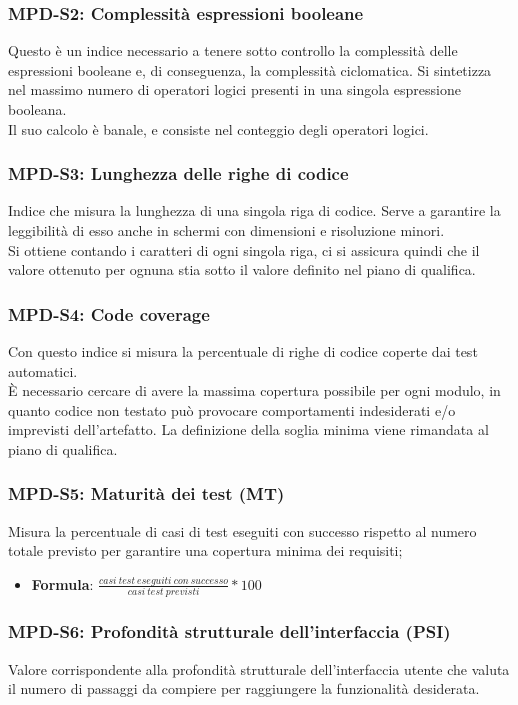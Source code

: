 \subsubsection{MPD-S2: Complessità espressioni booleane}
Questo è un indice necessario a tenere sotto controllo la complessità delle espressioni booleane e, di conseguenza, la complessità ciclomatica.
Si sintetizza nel massimo numero di operatori logici presenti in una singola espressione booleana.\\
Il suo calcolo è banale, e consiste nel conteggio degli operatori logici.

\subsubsection{MPD-S3: Lunghezza delle righe di codice}
Indice che misura la lunghezza di una singola riga di codice. Serve a garantire la leggibilità di esso anche in schermi
con dimensioni e risoluzione minori.\\
Si ottiene contando i caratteri di ogni singola riga, ci si assicura quindi che il valore ottenuto per ognuna stia sotto il valore
definito nel piano di qualifica.

\subsubsection{MPD-S4: Code coverage}
Con questo indice si misura la percentuale di righe di codice coperte dai test automatici.\\
È necessario cercare di avere la massima copertura possibile per ogni modulo, in quanto codice non testato
può provocare comportamenti indesiderati e/o imprevisti dell'artefatto. La definizione della soglia minima viene rimandata al piano di qualifica.


\subsubsection{MPD-S5: Maturità dei test (MT)}
Misura la percentuale di casi di test eseguiti con successo rispetto al numero totale previsto per garantire una copertura minima dei requisiti;
\begin{itemize}
    \item \textbf{Formula}: \(\frac{casi\ test\ eseguiti\ con\ successo}{casi\ test\ previsti}*100\)
    
\end{itemize}

\subsubsection{MPD-S6: Profondità strutturale dell'interfaccia (PSI)}
Valore corrispondente alla profondità strutturale dell'interfaccia utente che valuta il numero di passaggi da compiere per raggiungere la funzionalità desiderata.